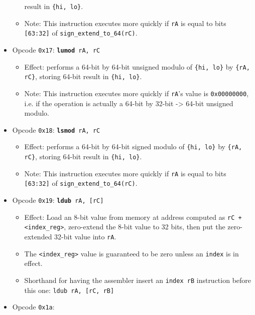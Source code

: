 \documentclass{article}
\begin{document}
\begin{itemize}
\begin{itemize}
			result in \texttt{\{hi, lo\}}.
			\item Note: This instruction executes more quickly if
			\texttt{rA} is equal to bits \texttt{[63:32]} of
			\texttt{sign\_extend\_to\_64(rC)}.
		\end{itemize}
		\item Opcode \texttt{0x17}:
			\texttt{\textbf{lumod} rA, rC}
		\begin{itemize}
			\item Effect: performs a 64-bit by 64-bit unsigned modulo of
			\texttt{\{hi, lo\}} by \texttt{\{rA, rC\}}, storing 64-bit
			result in \texttt{\{hi, lo\}}.
			\item Note: This instruction executes more quickly if
			\texttt{rA}'s value is \texttt{0x00000000}, i.e. if the
			operation is actually a 64-bit by 32-bit -> 64-bit unsigned
			modulo.
		\end{itemize}
		\item Opcode \texttt{0x18}:
			\texttt{\textbf{lsmod} rA, rC}
		\begin{itemize}
			\item Effect: performs a 64-bit by 64-bit signed modulo of
			\texttt{\{hi, lo\}} by \texttt{\{rA, rC\}}, storing 64-bit
			result in \texttt{\{hi, lo\}}.
			\item Note: This instruction executes more quickly if
			\texttt{rA} is equal to bits \texttt{[63:32]} of
			\texttt{sign\_extend\_to\_64(rC)}.
		\end{itemize}
		\item Opcode \texttt{0x19}:
			\texttt{\textbf{ldub} rA, [rC]}
		\begin{itemize}
			\item Effect: Load an 8-bit value from memory at address
			computed as \texttt{rC + <index\_reg>}, zero-extend
			the 8-bit value to 32 bits, then put the zero-extended 32-bit
			value into \texttt{rA}.
			\item The \texttt{<index\_reg>} value is guaranteed to be zero
			unless an \texttt{index} is in effect.
			\item Shorthand for having the assembler insert an
			\texttt{index rB} instruction before this one:
				\texttt{ldub rA, [rC, rB]}
		\end{itemize}
		\item Opcode \texttt{0x1a}:

\end{itemize}
\end{document}
